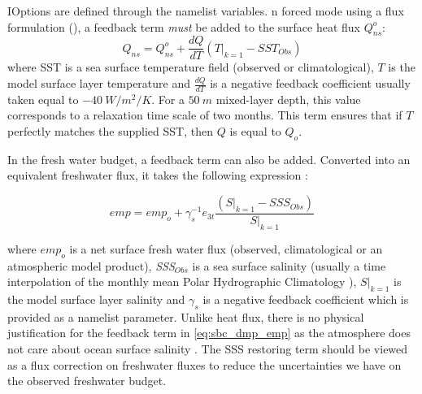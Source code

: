 \documentclass[../tex_main/NEMO_manual]{subfiles}
\begin{document}

IOptions are defined through the   namelist variables.
n forced mode using a flux formulation (), a 
feedback term \emph{must} be added to the surface heat flux $Q_{ns}^o$:
\begin{equation} \label{eq:sbc_dmp_q}
Q_{ns} = Q_{ns}^o + \frac{dQ}{dT} \left( \left. T \right|_{k=1} - SST_{Obs} \right)
\end{equation}
where SST is a sea surface temperature field (observed or climatological), $T$ is 
the model surface layer temperature and $\frac{dQ}{dT}$ is a negative feedback 
coefficient usually taken equal to $-40~W/m^2/K$. For a $50~m$ 
mixed-layer depth, this value corresponds to a relaxation time scale of two months. 
This term ensures that if $T$ perfectly matches the supplied SST, then $Q$ is 
equal to $Q_o$. 

In the fresh water budget, a feedback term can also be added. Converted into an 
equivalent freshwater flux, it takes the following expression :

\begin{equation} \label{eq:sbc_dmp_emp}
\textit{emp} = \textit{emp}_o + \gamma_s^{-1} e_{3t}  \frac{  \left(\left.S\right|_{k=1}-SSS_{Obs}\right)}
												         {\left.S\right|_{k=1}}
\end{equation}

where $\textit{emp}_{o }$ is a net surface fresh water flux (observed, climatological or an
atmospheric model product), \textit{SSS}$_{Obs}$ is a sea surface salinity (usually a time 
interpolation of the monthly mean Polar Hydrographic Climatology \citep{Steele2001}), 
$\left.S\right|_{k=1}$ is the model surface layer salinity and $\gamma_s$ is a negative 
feedback coefficient which is provided as a namelist parameter. Unlike heat flux, there is no 
physical justification for the feedback term in \autoref{eq:sbc_dmp_emp} as the atmosphere 
does not care about ocean surface salinity \citep{Madec1997}. The SSS restoring 
term should be viewed as a flux correction on freshwater fluxes to reduce the 
uncertainties we have on the observed freshwater budget.

\end{document}
